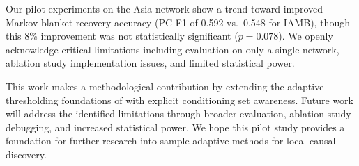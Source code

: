 \documentclass{article}
\theoremstyle{plain}
\theoremstyle{definition}
\begin{document}
Our pilot experiments on the Asia network show a trend toward improved Markov blanket recovery accuracy (PC F1 of 0.592 vs.~0.548 for IAMB), though this 8\% improvement was not statistically significant ($p = 0.078$). We openly acknowledge critical limitations including evaluation on only a single network, ablation study implementation issues, and limited statistical power.

This work makes a methodological contribution by extending the adaptive thresholding foundations of \citet{lerner2013adaptive} with explicit conditioning set awareness. Future work will address the identified limitations through broader evaluation, ablation study debugging, and increased statistical power. We hope this pilot study provides a foundation for further research into sample-adaptive methods for local causal discovery.
\end{document}
